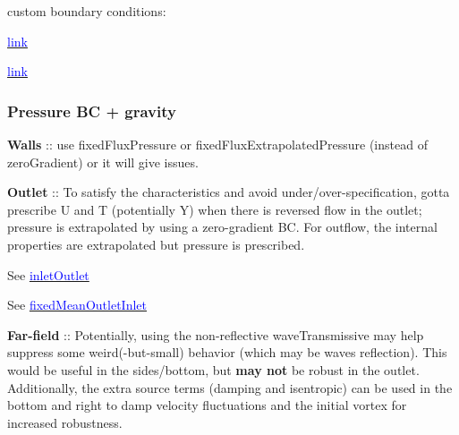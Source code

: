 \documentclass[a4paper, 12pt]{article}
\numberwithin{equation}{section}
\newcommand{\code}{\fontfamily{pcr}\selectfont}
\newcommand{\blue}[1]{\textcolor{blue}{#1}}
\begin{document}
            custom boundary conditions:

            \href{
            https://www.youtube.com/watch?v=3zcTxGHxuok
            }{\blue{link}}

            \href{
            https://www.cfd-online.com/Forums/openfoam-solving/119239-using-codedfixedvalue-apply-totalpressure-boundary-condition.html
            }{\blue{link}}

        \subsubsection{Pressure BC + gravity}

            \textbf{Walls} :: use {\code fixedFluxPressure} or {\code fixedFluxExtrapolatedPressure} (instead of {\code zeroGradient}) or it will give issues.


            \textbf{Outlet} :: To satisfy the characteristics and avoid under/over-specification, gotta prescribe U and T (potentially Y) when there is reversed flow in the outlet; pressure is extrapolated by using a zero-gradient BC. For outflow, the internal properties are extrapolated but pressure is prescribed.

            See \href{
            https://doc.openfoam.com/2306/tools/processing/boundary-conditions/rtm/derived/inletOutlet/inletOutlet/
            }{\blue{inletOutlet}}

            See \href{
            https://doc.openfoam.com/2306/tools/processing/boundary-conditions/rtm/derived/inletOutlet/fixedMeanOutletInlet/
            }{\blue{fixedMeanOutletInlet}}

            \textbf{Far-field} :: Potentially, using the non-reflective {\code waveTransmissive} may help suppress some weird(-but-small) behavior (which may be waves reflection). This would be useful in the sides/bottom, but \textbf{may not} be robust in the outlet. Additionally, the extra source terms (damping and isentropic) can be used in the bottom and right to damp velocity fluctuations and the initial vortex for increased robustness.
\end{document}
